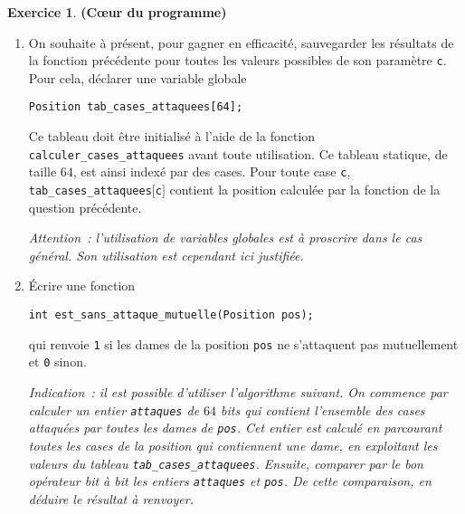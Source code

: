 \documentclass[11pt]{article}
\theoremstyle{definition}
\newtheorem{Exercice}{Exercice}
\begin{document}
\begin{Exercice}{\bf (C\oe ur du programme)}
\begin{enumerate}
    {\it Attention~: une dame n'attaque pas la case sur laquelle elle
    se trouve~!}
    \smallskip

    \item On souhaite à présent, pour gagner en efficacité,
    sauvegarder les résultats de la fonction précédente pour toutes
    les valeurs possibles de son paramètre {\tt c}. Pour cela,
    déclarer une variable globale
\begin{lstlisting}
Position tab_cases_attaquees[64];
\end{lstlisting}\newpage
    Ce tableau doit être initialisé à l'aide de la fonction
    {\tt calculer\_cases\_attaquees} avant toute utilisation. Ce tableau
    statique, de taille $64$, est ainsi indexé par des cases. Pour toute
    case {\tt c}, {\tt tab\_cases\_attaquees$[$c$]$} contient la
    position calculée par la fonction de la question précédente.
    \smallskip

    {\it Attention~: l'utilisation de variables globales est à
    proscrire dans le cas général. Son utilisation est cependant ici
    justifiée.}
    \smallskip

    \item Écrire une fonction
\begin{lstlisting}
int est_sans_attaque_mutuelle(Position pos);
\end{lstlisting}
    qui renvoie {\tt 1} si les dames de la position {\tt pos} ne
    s'attaquent pas mutuellement et {\tt 0} sinon.
    \smallskip

    {\it Indication~: il est possible d'utiliser l'algorithme
    suivant. On commence par calculer un entier {\tt attaques} de
    $64$ bits qui contient l'ensemble des cases attaquées par toutes
    les dames de {\tt pos}. Cet entier est calculé en parcourant toutes
    les cases de la position qui contiennent une dame, en
    exploitant les valeurs du tableau {\tt tab\_cases\_attaquees}.
    Ensuite, comparer par le bon opérateur
    bit à bit les entiers {\tt attaques} et {\tt pos}. De cette
    comparaison, en déduire le résultat à renvoyer.}
\end{enumerate}
\end{Exercice}
\bigskip
\end{document}
